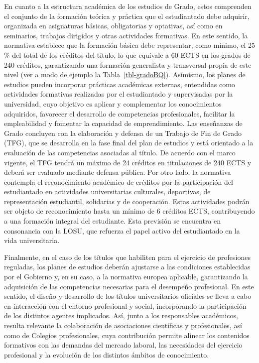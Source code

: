 \documentclass[
  11pt,
  a4paper,
  twoside]{scrreprt}
\begin{document}
En cuanto a la estructura académica de los estudios de Grado, estos
comprenden el conjunto de la formación teórica y práctica que el
estudiantado debe adquirir, organizada en asignaturas básicas,
obligatorias y optativas, así como en seminarios, trabajos dirigidos y
otras actividades formativas. En este sentido, la normativa establece
que la formación básica debe representar, como mínimo, el 25 \% del
total de los créditos del título, lo que equivale a 60 ECTS en los
grados de 240 créditos, garantizando una formación generalista y
transversal propia de este nivel (ver a modo de ejemplo la
Tabla~\ref{tbl-gradoBQ}). Asimismo, los planes de estudios pueden
incorporar prácticas académicas externas, entendidas como actividades
formativas realizadas por el estudiantado y supervisadas por la
universidad, cuyo objetivo es aplicar y complementar los conocimientos
adquiridos, favorecer el desarrollo de competencias profesionales,
facilitar la empleabilidad y fomentar la capacidad de emprendimiento.
Las enseñanzas de Grado concluyen con la elaboración y defensa de un
Trabajo de Fin de Grado (TFG), que se desarrolla en la fase final del
plan de estudios y está orientado a la evaluación de las competencias
asociadas al título. De acuerdo con el marco vigente, el TFG tendrá un
máximo de 24 créditos en titulaciones de 240 ECTS y deberá ser evaluado
mediante defensa pública. Por otro lado, la normativa contempla el
reconocimiento académico de créditos por la participación del
estudiantado en actividades universitarias culturales, deportivas, de
representación estudiantil, solidarias y de cooperación. Estas
actividades podrán ser objeto de reconocimiento hasta un mínimo de 6
créditos ECTS, contribuyendo a una formación integral del estudiante.
Esta previsión se encuentra en consonancia con la LOSU, que refuerza el
papel activo del estudiantado en la vida universitaria.

Finalmente, en el caso de los títulos que habiliten para el ejercicio de
profesiones reguladas, los planes de estudios deberán ajustarse a las
condiciones establecidas por el Gobierno y, en su caso, a la normativa
europea aplicable, garantizando la adquisición de las competencias
necesarias para el desempeño profesional. En este sentido, el diseño y
desarrollo de los títulos universitarios oficiales se lleva a cabo en
interacción con el entorno profesional y social, incorporando la
participación de los distintos agentes implicados. Así, junto a los
responsables académicos, resulta relevante la colaboración de
asociaciones científicas y profesionales, así como de Colegios
profesionales, cuya contribución permite alinear los contenidos
formativos con las demandas del mercado laboral, las necesidades del
ejercicio profesional y la evolución de los distintos ámbitos de
conocimiento.
\end{document}
